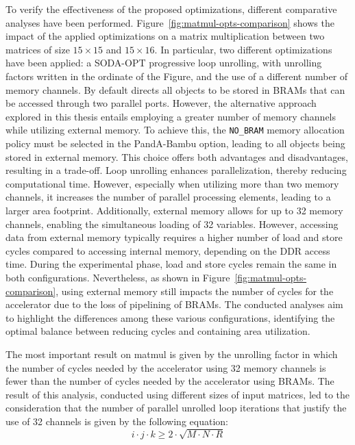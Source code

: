 \documentclass[11pt,a4paper,twocolumn]{article}
\begin{document}
To verify the effectiveness of the proposed optimizations, different comparative analyses have been performed.
Figure~\ref{fig:matmul-opts-comparison} shows the impact of the applied optimizations on a matrix multiplication between two matrices of size $15 \times 15$ and $15 \times 16$.
In particular, two different optimizations have been applied: a SODA-OPT progressive loop unrolling, with unrolling factors written in the ordinate of the Figure, and the use of a different number of memory channels.
By default directs all objects to be stored in BRAMs that can be accessed through two parallel ports.
However, the alternative approach explored in this thesis entails employing a greater number of memory channels while utilizing external memory.
To achieve this, the \lstinline{NO_BRAM} memory allocation policy must be selected in the PandA-Bambu option, leading to all objects being stored in external memory.
This choice offers both advantages and disadvantages, resulting in a trade-off.
Loop unrolling enhances parallelization, thereby reducing computational time.
However, especially when utilizing more than two memory channels, it increases the number of parallel processing elements, leading to a larger area footprint.
Additionally, external memory allows for up to 32 memory channels, enabling the simultaneous loading of 32 variables.
However, accessing data from external memory typically requires a higher number of load and store cycles compared to accessing internal memory, depending on the DDR access time.
During the experimental phase, load and store cycles remain the same in both configurations.
Nevertheless, as shown in Figure~\ref{fig:matmul-opts-comparison}, using external memory still impacts the number of cycles for the accelerator due to the loss of pipelining of BRAMs.
The conducted analyses aim to highlight the differences among these various configurations, identifying the optimal balance between reducing cycles and containing area utilization.

The most important result on matmul is given by the unrolling factor in which the number of cycles needed by the accelerator using 32 memory channels is fewer than the number of cycles needed by the accelerator using BRAMs.
The result of this analysis, conducted using different sizes of input matrices, led to the consideration that the number of parallel unrolled loop iterations that justify the use of 32 channels is given by the following equation:
\begin{equation}
    \label{eq:factor-relation}
        i \cdot j \cdot k \geq 2 \cdot \sqrt {M \cdot N \cdot R}
\end{equation}
\end{document}
